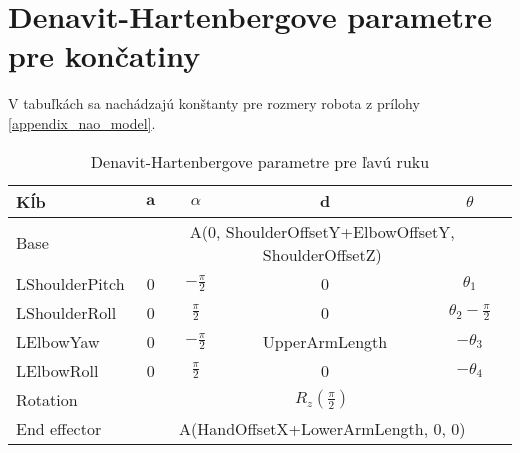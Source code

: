 \section{Denavit-Hartenbergove parametre pre končatiny} \label{appedix_dh}
V tabuľkách sa nachádzajú konštanty pre rozmery robota z prílohy \ref{appendix_nao_model}.

\begin{table}[H]
	\centering
	\caption{Denavit-Hartenbergove parametre pre ľavú ruku}
	\begin{tabular}{|l|c|c|c|c|}
	\hline
	\textbf{Kĺb} & $\textbf{a}$ & $\mathbb{\alpha}$ & $\textbf{d}$ & $\theta$ \\
	\hline
	Base & \multicolumn{4}{|c|}{A(0, ShoulderOffsetY+ElbowOffsetY, ShoulderOffsetZ)} \\
	\hline
	LShoulderPitch & 0 & $-\frac{\pi}{2}$ & 0 & $\theta_1$ \\
	\hline
	LShoulderRoll & 0 & $\frac{\pi}{2}$ & 0 & $\theta_2 - \frac{\pi}{2}$ \\
	\hline
	LElbowYaw & 0 & $-\frac{\pi}{2}$ & UpperArmLength & $-\theta_3$ \\
	\hline
	LElbowRoll & 0 & $\frac{\pi}{2}$ & 0 & $-\theta_4$ \\
	\hline
	Rotation & \multicolumn{4}{|c|}{$R_z\left(\frac{\pi}{2}\right)$} \\
	\hline
	End effector & \multicolumn{4}{|c|}{A(HandOffsetX+LowerArmLength, 0, 0)} \\
	\hline
	\end{tabular}
\end{table}

